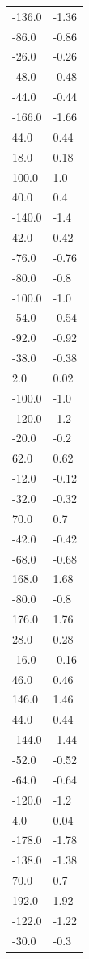 \begin{longtable}{ll}
-136.0 & -1.36 \\
-86.0 & -0.86 \\
-26.0 & -0.26 \\
-48.0 & -0.48 \\
-44.0 & -0.44 \\
-166.0 & -1.66 \\
44.0 & 0.44 \\
18.0 & 0.18 \\
100.0 & 1.0 \\
40.0 & 0.4 \\
-140.0 & -1.4 \\
42.0 & 0.42 \\
-76.0 & -0.76 \\
-80.0 & -0.8 \\
-100.0 & -1.0 \\
-54.0 & -0.54 \\
-92.0 & -0.92 \\
-38.0 & -0.38 \\
2.0 & 0.02 \\
-100.0 & -1.0 \\
-120.0 & -1.2 \\
-20.0 & -0.2 \\
62.0 & 0.62 \\
-12.0 & -0.12 \\
-32.0 & -0.32 \\
70.0 & 0.7 \\
-42.0 & -0.42 \\
-68.0 & -0.68 \\
168.0 & 1.68 \\
-80.0 & -0.8 \\
176.0 & 1.76 \\
28.0 & 0.28 \\
-16.0 & -0.16 \\
46.0 & 0.46 \\
146.0 & 1.46 \\
44.0 & 0.44 \\
-144.0 & -1.44 \\
-52.0 & -0.52 \\
-64.0 & -0.64 \\
-120.0 & -1.2 \\
4.0 & 0.04 \\
-178.0 & -1.78 \\
-138.0 & -1.38 \\
70.0 & 0.7 \\
192.0 & 1.92 \\
-122.0 & -1.22 \\
-30.0 & -0.3 \\

\end{longtable}
